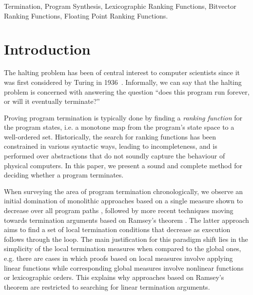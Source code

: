 \documentclass[preprint]{sigplanconf}
\theoremstyle{definition}
\begin{document}
\keywords
Termination, Program Synthesis, Lexicographic Ranking Functions, Bitvector Ranking Functions,
Floating Point Ranking Functions.

\section{Introduction}\label{sec:intro}


The halting problem has been of central interest to computer scientists since it was first
considered by Turing in 1936~\cite{turing}.  Informally, we can say that the halting problem
is concerned with answering the question ``does this
program run forever, or will it eventually terminate?''

Proving program termination is typically done by finding a \emph{ranking function}
for the program states, i.e. a monotone map from the program's state space to a well-ordered set.
Historically, the search for ranking functions has been constrained in various syntactic ways, leading to
incompleteness, and
is performed over abstractions that do not soundly capture the behaviour of physical computers.
In this paper, we present a sound and complete method for deciding whether a program terminates.


When surveying the area of program termination chronologically, we observe an initial domination of  monolithic approaches based on a single measure shown to decrease
over all program paths %
\cite{DBLP:conf/vmcai/P04,DBLP:conf/cav/BradleyMS05}, followed by 
more recent techniques moving towards termination arguments based on Ramsey's theorem \cite{DBLP:conf/lpe/CodishG03,DBLP:conf/lics/PodelskiR04,DBLP:conf/pldi/CookPR06}.
The latter approach aims to find a set of local termination conditions that decrease as execution follows through the loop. %
The main justification for this paradigm shift lies in the simplicity of the local termination measures when compared to the global ones, e.g.
there are cases in which proofs based on local measures involve applying linear functions while corresponding global
measures involve nonlinear functions or lexicographic orders. 
This explains why approaches based on Ramsey's theorem are restricted to searching for linear termination arguments.
\end{document}
